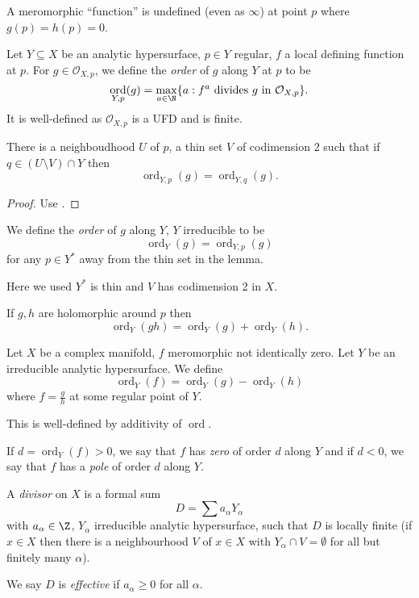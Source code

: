 \documentclass[a4paper]{article}
\DeclareMathOperator{\ord}{ord} %
\begin{document}
A meromorphic ``function'' is undefined (even as \(\infty\)) at point \(p\) where \(g(p) = h(p) = 0\).

\begin{definition}
  Let \(Y \subseteq X\) be an analytic hypersurface, \(p \in Y\) regular, \(f\) a local defining function at \(p\). For \(g \in \mathcal O_{X, p}\), we define the \emph{order} of \(g\) along \(Y\) at \(p\) to be
  \[
    \ord_{Y, p}(g) = \max_{a \in \N} \{a: f^a \text{ divides } g \text{ in } \mathcal O_{X, p}\}.
  \]
  It is well-defined as \(\mathcal O_{X, p}\) is a UFD and is finite.
\end{definition}

\begin{lemma}
  There is a neighboudhood \(U\) of \(p\), a thin set \(V\) of codimension \(2\) such that if \(q \in (U \setminus V) \cap Y\) then
  \[
    \ord_{Y, p}(g) = \ord_{Y, q}(g).
  \]
\end{lemma}

\begin{proof}
  Use .
\end{proof}

\begin{definition}[order]
  We define the \emph{order} of \(g\) along \(Y\), \(Y\) irreducible to be
  \[
    \ord_Y(g) = \ord_{Y, p}(g)
  \]
  for any \(p \in Y^*\) away from the thin set in the lemma.
\end{definition}
Here we used \(Y^*\) is thin and \(V\) has codimension 2 in \(X\).

If \(g, h\) are holomorphic around \(p\) then
\[
  \ord_Y (gh) = \ord_Y (g) + \ord_Y (h).
\]

\begin{definition}[order]
  Let \(X\) be a complex manifold, \(f\) meromorphic not identically zero. Let \(Y\) be an irreducible analytic hypersurface. We define
  \[
    \ord_Y(f) = \ord_Y(g) - \ord_Y(h)
  \]
  where \(f = \frac{g}{h}\) at some regular point of \(Y\).
\end{definition}
This is well-defined by additivity of \(\ord\).

If \(d = \ord_Y(f) > 0\), we say that \(f\) has \emph{zero} of order \(d\) along \(Y\) and if \(d < 0\), we say that \(f\) has a \emph{pole} of order \(d\) along \(Y\).

\begin{definition}[divisor]
  A \emph{divisor} on \(X\) is a formal sum
  \[
    D = \sum a_\alpha Y_\alpha
  \]
  with \(a_\alpha \in \Z\), \(Y_\alpha\) irreducible analytic hypersurface, such that \(D\) is locally finite (if \(x \in X\) then there is a neighbourhood \(V\) of \(x \in X\) with \(Y_\alpha \cap V = \emptyset\) for all but finitely many \(\alpha\)).

  We say \(D\) is \emph{effective} if \(a_\alpha \geq 0\) for all \(\alpha\).
\end{definition}
\end{document}
